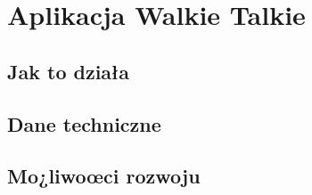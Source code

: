 \chapter{Aplikacja Walkie Talkie}
\label{sec:Aplikacja Walkie Talkie}

    \section{Jak to działa}

  \section{Dane techniczne}

    \section{Mo¿liwoœci rozwoju}
